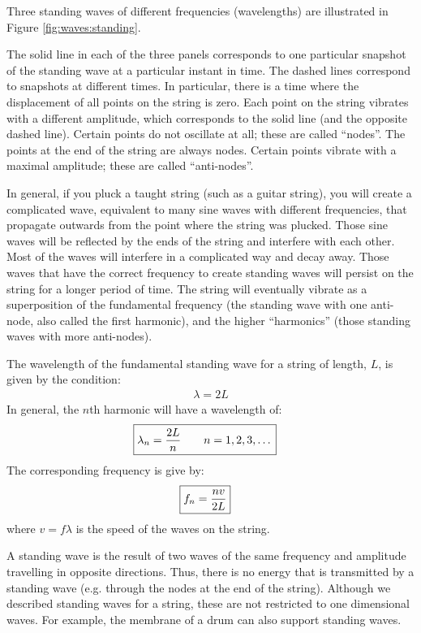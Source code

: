 Three standing waves of different frequencies (wavelengths) are illustrated in Figure \ref{fig:waves:standing}.

The solid line in each of the three panels corresponds to one particular snapshot of the standing wave at a particular instant in time. The dashed lines correspond to snapshots at different times. In particular, there is a time where the displacement of all points on the string is zero. Each point on the string vibrates with a different amplitude, which corresponds to the solid line (and the opposite dashed line). Certain points do not oscillate at all; these are called ``nodes''. The points at the end of the string are always nodes. Certain points vibrate with a maximal amplitude; these are called ``anti-nodes''.

In general, if you pluck a taught string (such as a guitar string), you will create a complicated wave, equivalent to many sine waves with different frequencies, that propagate outwards from the point where the string was plucked. Those sine waves will be reflected by the ends of the string and interfere with each other. Most of the waves will interfere in a complicated way and decay away. Those waves that have the correct frequency to create standing waves will persist on the string for a longer period of time. The string will eventually vibrate as a superposition of the fundamental frequency (the standing wave with one anti-node, also called the first harmonic), and the higher ``harmonics'' (those standing waves with more anti-nodes).

The wavelength of the fundamental standing wave for a string of length, $L$, is given by the condition:
\begin{align*}
\lambda = 2L
\end{align*}
In general, the $n$th harmonic will have a wavelength of:
\begin{align}
\Aboxed{\lambda_n = \frac{2L}{n}\quad\quad n=1,2,3,\dots}
\end{align}
The corresponding frequency is give by:
\begin{align}
\Aboxed{f_n =\frac{nv}{2L}}
\end{align}
where $v=f\lambda$ is the speed of the waves on the string.

A standing wave is the result of two waves of the same frequency and amplitude travelling in opposite directions. Thus, there is no energy that is transmitted by a standing wave (e.g. through the nodes at the end of the string). Although we described standing waves for a string, these are not restricted to one dimensional waves. For example, the membrane of a drum can also support standing waves.


